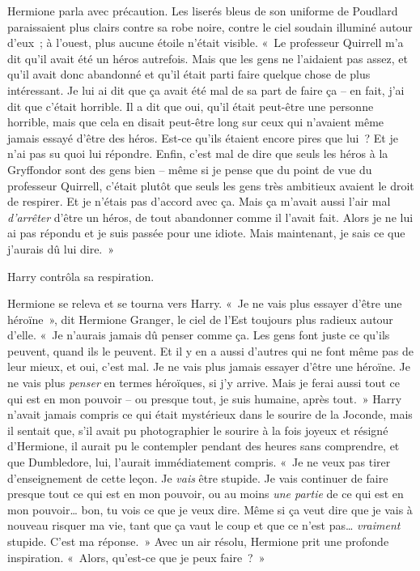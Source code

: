 Hermione parla avec précaution. Les liserés bleus de son uniforme de Poudlard paraissaient plus clairs contre sa robe noire, contre le ciel soudain illuminé autour d'eux~; à l'ouest, plus aucune étoile n'était visible. «~Le professeur Quirrell m'a dit qu'il avait été un héros autrefois. Mais que les gens ne l'aidaient pas assez, et qu'il avait donc abandonné et qu'il était parti faire quelque chose de plus intéressant. Je lui ai dit que ça avait été mal de sa part de faire ça -- en fait, j'ai dit que c'était horrible. Il a dit que oui, qu'il était peut-être une personne horrible, mais que cela en disait peut-être long sur ceux qui n'avaient même jamais essayé d'être des héros. Est-ce qu'ils étaient encore pires que lui~? Et je n'ai pas su quoi lui répondre. Enfin, c'est mal de dire que seuls les héros à la Gryffondor sont des gens bien -- même si je pense que du point de vue du professeur Quirrell, c'était plutôt que seuls les gens très ambitieux avaient le droit de respirer. Et je n'étais pas d'accord avec ça. Mais ça m'avait aussi l'air mal \emph{d'arrêter} d'être un héros, de tout abandonner comme il l'avait fait. Alors je ne lui ai pas répondu et je suis passée pour une idiote. Mais maintenant, je sais ce que j'aurais dû lui dire.~»

Harry contrôla sa respiration.

Hermione se releva et se tourna vers Harry. «~Je ne vais plus essayer d'être une héroïne~», dit Hermione Granger, le ciel de l'Est toujours plus radieux autour d'elle. «~Je n'aurais jamais dû penser comme ça. Les gens font juste ce qu'ils peuvent, quand ils le peuvent. Et il y en a aussi d'autres qui ne font même pas de leur mieux, et oui, c'est mal. Je ne vais plus jamais essayer d'être une héroïne. Je ne vais plus \emph{penser} en termes héroïques, si j'y arrive. Mais je ferai aussi tout ce qui est en mon pouvoir -- ou presque tout, je suis humaine, après tout.~» Harry n'avait jamais compris ce qui était mystérieux dans le sourire de la Joconde, mais il sentait que, s'il avait pu photographier le sourire à la fois joyeux et résigné d'Hermione, il aurait pu le contempler pendant des heures sans comprendre, et que Dumbledore, lui, l'aurait immédiatement compris. «~Je ne veux pas tirer d'enseignement de cette leçon. Je \emph{vais} être stupide. Je vais continuer de faire presque tout ce qui est en mon pouvoir, ou au moins \emph{une partie} de ce qui est en mon pouvoir… bon, tu vois ce que je veux dire. Même si ça veut dire que je vais à nouveau risquer ma vie, tant que ça vaut le coup et que ce n'est pas… \emph{vraiment} stupide. C'est ma réponse.~» Avec un air résolu, Hermione prit une profonde inspiration. «~Alors, qu'est-ce que je peux faire~?~»

